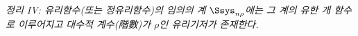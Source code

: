 
\emph{정리 IV: 유리함수(또는 정유리함수)의 임의의 계 $\Ssys_{n\rho}$에는 그 계의 유한 개 함수로 이루어지고 대수적 계수(階數)가 $\rho$인 유리기저가 존재한다.}
